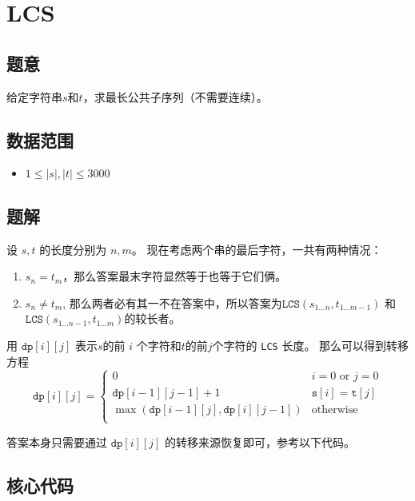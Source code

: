 \section{LCS}
\subsection*{题意}
给定字符串$s$和$t$，求最长公共子序列（不需要连续）。

\subsection*{数据范围}
\begin{itemize}
\item $1 \leq |s|, |t| \leq 3000$
\end{itemize}


\subsection*{题解}

设 $s,t$ 的长度分别为 $n,m$。
现在考虑两个串的最后字符，一共有两种情况：
\begin{enumerate}
\item $s_n = t_m$，那么答案最末字符显然等于也等于它们俩。
\item $s_n \ne t_m$, 那么两者必有其一不在答案中，所以答案为${\texttt{LCS}}(s_{1\ldots n},t_{1\ldots m-1})$ 和${\texttt{LCS}}(s_{1\ldots n-1},t_{1\ldots m})$的较长者。
\end{enumerate}

用 ${\texttt{dp}[i][j]}$ 表示$s$的前 $i$ 个字符和$t$的前$j$个字符的 {\texttt{LCS}} 长度。
那么可以得到转移方程
\begin{equation*}
{\texttt{dp}[i][j]} = 
\begin{cases}
 0 & i = 0 \text{ or } j = 0\\
 {\texttt{dp}[i-1][j-1]} + 1 & {\texttt{s}[i]} = {\texttt{t}[j]}\\
\max({\texttt{dp}[i-1][j]},{\texttt{dp}[i][j-1]}) & \text{otherwise} \\
\end{cases}
\end{equation*}

答案本身只需要通过 ${\texttt{dp}[i][j]}$ 的转移来源恢复即可，参考以下代码。

\subsection*{核心代码}
\inputminted[linenos,autogobble]{cpp}{./Code/F.cpp}
\newpage